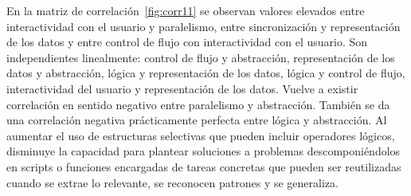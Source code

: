 \documentclass[a4paper, 12pt]{book}
\begin{document}
En la matriz de correlación~\ref{fig:corr11} se observan valores elevados entre interactividad con el usuario y paralelismo, entre sincronización y representación de los datos y entre control de flujo con interactividad con el usuario. Son independientes linealmente: control de flujo y abstracción, representación de los datos y abstracción, lógica y representación de los datos, lógica y control de flujo, interactividad del usuario y representación de los datos. Vuelve a existir correlación en sentido negativo entre paralelismo y abstracción. También se da una correlación negativa prácticamente perfecta entre lógica y abstracción. Al aumentar el uso de estructuras selectivas que pueden incluir operadores lógicos, disminuye la capacidad para plantear soluciones a problemas descomponiéndolos en scripts o funciones encargadas de tareas concretas que pueden ser reutilizadas cuando se extrae lo relevante, se reconocen patrones y se generaliza. %
\end{document}
